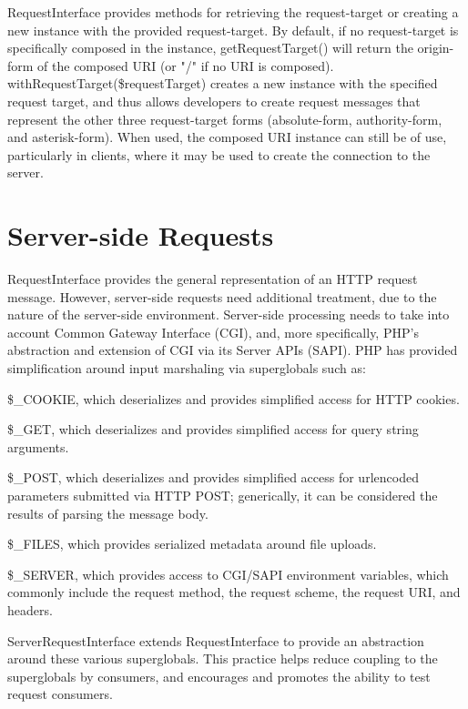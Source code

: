 RequestInterface provides methods for retrieving the request-target or creating a new instance with the provided request-target. By default, if no request-target is specifically composed in the instance, getRequestTarget() will return the origin-form of the composed URI (or "/" if no URI is composed). withRequestTarget(\$requestTarget) creates a new instance with the specified request target, and thus allows developers to create request messages that represent the other three request-target forms (absolute-form, authority-form, and asterisk-form). When used, the composed URI instance can still be of use, particularly in clients, where it may be used to create the connection to the server.

\section{Server-side Requests}


RequestInterface provides the general representation of an HTTP request message. However, server-side requests need additional treatment, due to the nature of the server-side environment. Server-side processing needs to take into account Common Gateway Interface (CGI), and, more specifically, PHP's abstraction and extension of CGI via its Server APIs (SAPI). PHP has provided simplification around input marshaling via superglobals such as:

\begin{compactitem}
\item \$\_COOKIE, which deserializes and provides simplified access for HTTP cookies.
\item \$\_GET, which deserializes and provides simplified access for query string arguments.
\item \$\_POST, which deserializes and provides simplified access for urlencoded parameters submitted via HTTP POST; generically, it can be considered the results of parsing the message body.
\item \$\_FILES, which provides serialized metadata around file uploads.
\item \$\_SERVER, which provides access to CGI/SAPI environment variables, which commonly include the request method, the request scheme, the request URI, and headers.
\end{compactitem}

ServerRequestInterface extends RequestInterface to provide an abstraction around these various superglobals. This practice helps reduce coupling to the superglobals by consumers, and encourages and promotes the ability to test request consumers.

